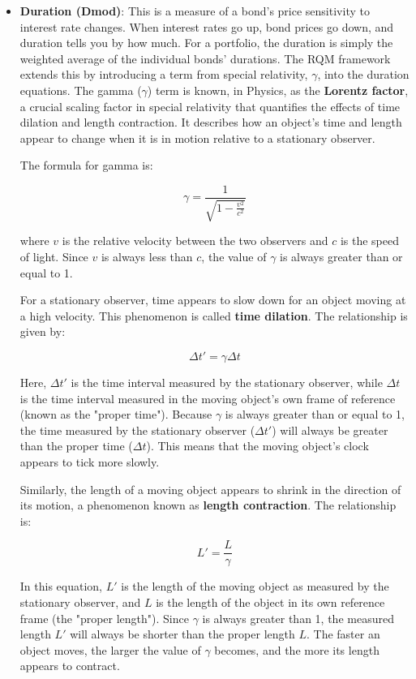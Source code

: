 \documentclass{article}
\begin{document}
\begin{itemize}
\item \textbf{Duration (Dmod)}: This is a measure of a bond's price sensitivity to interest rate changes. When interest rates go up, bond prices go down, and duration tells you by how much. For a portfolio, the duration is simply the weighted average of the individual bonds' durations. The RQM framework extends this by introducing a term from special relativity, $\gamma$, into the duration equations.  The gamma ($\gamma$) term is known, in Physics, as the \textbf{Lorentz factor}, a crucial scaling factor in special relativity that quantifies the effects of time dilation and length contraction. It describes how an object's time and length appear to change when it is in motion relative to a stationary observer.

The formula for gamma is:

$$ \gamma = \frac{1}{\sqrt{1 - \frac{v^2}{c^2}}} $$

where $v$ is the relative velocity between the two observers and $c$ is the speed of light. Since $v$ is always less than $c$, the value of $\gamma$ is always greater than or equal to 1.

For a stationary observer, time appears to slow down for an object moving at a high velocity. This phenomenon is called \textbf{time dilation}. The relationship is given by:

$$ \Delta t' = \gamma \Delta t $$

Here, $\Delta t'$ is the time interval measured by the stationary observer, while $\Delta t$ is the time interval measured in the moving object's own frame of reference (known as the "proper time"). Because $\gamma$ is always greater than or equal to 1, the time measured by the stationary observer ($\Delta t'$) will always be greater than the proper time ($\Delta t$). This means that the moving object's clock appears to tick more slowly.

Similarly, the length of a moving object appears to shrink in the direction of its motion, a phenomenon known as \textbf{length contraction}. The relationship is:

$$ L' = \frac{L}{\gamma} $$

In this equation, $L'$ is the length of the moving object as measured by the stationary observer, and $L$ is the length of the object in its own reference frame (the "proper length"). Since $\gamma$ is always greater than 1, the measured length $L'$ will always be shorter than the proper length $L$. The faster an object moves, the larger the value of $\gamma$ becomes, and the more its length appears to contract.



\end{itemize}
\end{document}
